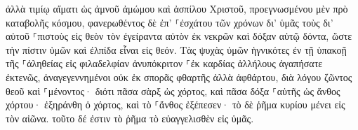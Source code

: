 \documentclass{openreader}
\begin{document}
ἀλλὰ τιμίῳ αἵματι ὡς ἀμνοῦ ἀμώμου καὶ ἀσπίλου Χριστοῦ, 
προεγνωσμένου μὲν πρὸ καταβολῆς κόσμου, φανερωθέντος δὲ ἐπ’ ⸀ἐσχάτου τῶν χρόνων δι’ ὑμᾶς 
τοὺς δι’ αὐτοῦ ⸀πιστοὺς εἰς θεὸν τὸν ἐγείραντα αὐτὸν ἐκ νεκρῶν καὶ δόξαν αὐτῷ δόντα, ὥστε τὴν πίστιν ὑμῶν καὶ ἐλπίδα εἶναι εἰς θεόν. 
Τὰς ψυχὰς ὑμῶν ἡγνικότες ἐν τῇ ὑπακοῇ τῆς ⸀ἀληθείας εἰς φιλαδελφίαν ἀνυπόκριτον ⸀ἐκ καρδίας ἀλλήλους ἀγαπήσατε ἐκτενῶς, 
ἀναγεγεννημένοι οὐκ ἐκ σπορᾶς φθαρτῆς ἀλλὰ ἀφθάρτου, διὰ λόγου ζῶντος θεοῦ καὶ ⸀μένοντος· 
διότι πᾶσα σὰρξ ὡς χόρτος, καὶ πᾶσα δόξα ⸀αὐτῆς ὡς ἄνθος χόρτου· ἐξηράνθη ὁ χόρτος, καὶ τὸ ⸀ἄνθος ἐξέπεσεν· 
τὸ δὲ ῥῆμα κυρίου μένει εἰς τὸν αἰῶνα. τοῦτο δέ ἐστιν τὸ ῥῆμα τὸ εὐαγγελισθὲν εἰς ὑμᾶς. 
\end{document}
